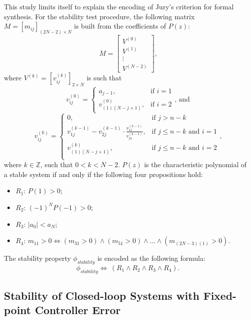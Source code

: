 \documentclass[runningheads,a4paper]{llncs}
\begin{document}
This study limits itself to explain the encoding of Jury's criterion for
formal synthesis.  For the stability test procedure, the following matrix
$M=[m_{ij}]_{(2N-2)\times N}$ is built from the coefficients of $P(z)$:
%
$$
M=\left[
\begin{matrix}
  V^{(0)} \\
  V^{(1)} \\
  \vdots \\
  V^{(N-2)}
 \end{matrix}
\right]\mbox{,}
$$
\noindent where $V^{(k)}=[v^{(k)}_{ij}]_{2\times N}$ is such that
$$
v^{(0)}_{ij}=\begin{cases} 
a_{j-1}, & \mbox{if } i=1 \\   v^{(0)}_{(1)(N-j+1)}, & \mbox{if } i=2 
\end{cases}\mbox{, and} 
$$
$$
v^{(k)}_{ij}=\begin{cases} 
0, & \mbox{if } j>n-k\\
v^{(k-1)}_{1j}-v^{(k-1)}_{2j}\cdot\frac{v^{(k-1)}_{11}}{v^{(k-1)}_{21}}, & \mbox{if } j\leq n-k  \mbox{ and } i=1 \\
v^{(k)}_{(1)(N-j+1)}, & \mbox{if } j\leq n-k \mbox{ and } i=2 \\
\end{cases} \mbox{,}
$$
\noindent where $k\in\mathbb{Z}$, such that $0<k<N-2$. $P(z)$ is the 
characteristic polynomial of a stable system if and only if the following 
four propositions hold:
\begin{itemize}
\item $R_{1}$: $P(1)>0$;
\item $R_{2}$: $(-1)^{N}P(-1)>0$;
\item $R_{3}$: $\vert{a_{0}}\vert <a_{N}$;
\item $R_{4}$: $m_{11}>0\iff (m_{31}>0)\wedge (m_{51}>0)\wedge \ldots \wedge (m_{(2N-3)(1)}>0)$.
\end{itemize}
%
The stability property $\phi_\mathit{stability}$ is encoded as the following formula:
$$
\phi_\mathit{stability}\iff \ (R_{1} \wedge R_{2} \wedge R_{3} \wedge R_{4}).
$$

\subsection{Stability of Closed-loop Systems with Fixed-point Controller Error}
\end{document}
